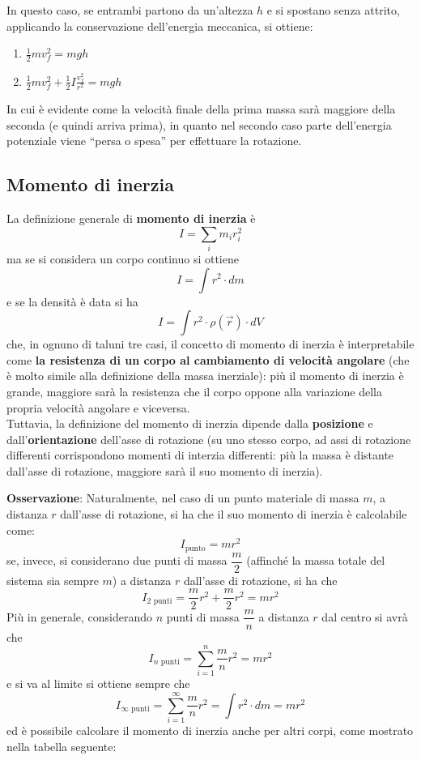 \documentclass[a4paper]{extarticle}
\newcommand{\quotes}[1]{``#1''}
\begin{document}
\noindent
In questo caso, se entrambi partono da un'altezza $h$ e si spostano senza attrito, applicando la conservazione dell'energia meccanica, si ottiene:
\begin{enumerate}
  \item $\displaystyle{\frac{1}{2}m v_f^2 = mgh}$
  \item $\displaystyle{\frac{1}{2}m v_f^2 + \frac{1}{2} I \frac{v_f^2}{r^2} = mgh}$
\end{enumerate}
In cui è evidente come la velocità finale della prima massa sarà maggiore della seconda (e quindi arriva prima), in quanto nel secondo caso parte dell'energia potenziale viene \quotes{persa o spesa} per effettuare la rotazione.

\vspace{1em}
\subsection{Momento di inerzia}
La definizione generale di \textbf{momento di inerzia} è
\[I=\sum_i m_i r_i^2\]
ma se si considera un corpo continuo si ottiene
\[I=\int r^2 \cdot dm\]
e se la densità è data si ha
\[I=\int r^2 \cdot \rho(\vec r) \cdot dV\]
che, in ognuno di taluni tre casi, il concetto di momento di inerzia è interpretabile come \textbf{la resistenza di un corpo al cambiamento di velocità angolare} (che è molto simile alla definizione della massa inerziale): più il momento di inerzia è grande, maggiore sarà la resistenza che il corpo oppone alla variazione della propria velocità angolare e viceversa.\\
Tuttavia, la definizione del momento di inerzia dipende dalla \textbf{posizione} e dall'\textbf{orientazione} dell'asse di rotazione (su uno stesso corpo, ad assi di rotazione differenti corrispondono momenti di interzia differenti: più la massa è distante dall'asse di rotazione, maggiore sarà il suo momento di inerzia).

\vspace{1em}
\noindent
\textbf{Osservazione}: Naturalmente, nel caso di un punto materiale di massa $m$, a distanza $r$ dall'asse di rotazione, si ha che il suo momento di inerzia è calcolabile come:
\[I_{\text{punto}}= m r^2\]
se, invece, si considerano due punti di massa $\dfrac{m}{2}$ (affinché la massa totale del sistema sia sempre $m$) a distanza $r$ dall'asse di rotazione, si ha che
\[I_{2 \text{ punti}} = \frac{m}{2}r^2 + \frac{m}{2}r^2 = mr^2\]
Più in generale, considerando $n$ punti di massa $\dfrac{m}{n}$ a distanza $r$ dal centro si avrà che
\[I_{n \text{ punti}} = \sum_{i=1}^n \frac{m}{n} r^2 = m r^2\]
e si va al limite si ottiene sempre che
\[I_{\infty \text{ punti}} = \sum_{i=1}^\infty \frac{m}{n} r^2 =  \int r^2 \cdot dm = m r^2\]
ed è possibile calcolare il momento di inerzia anche per altri corpi, come mostrato nella tabella seguente:
\end{document}
